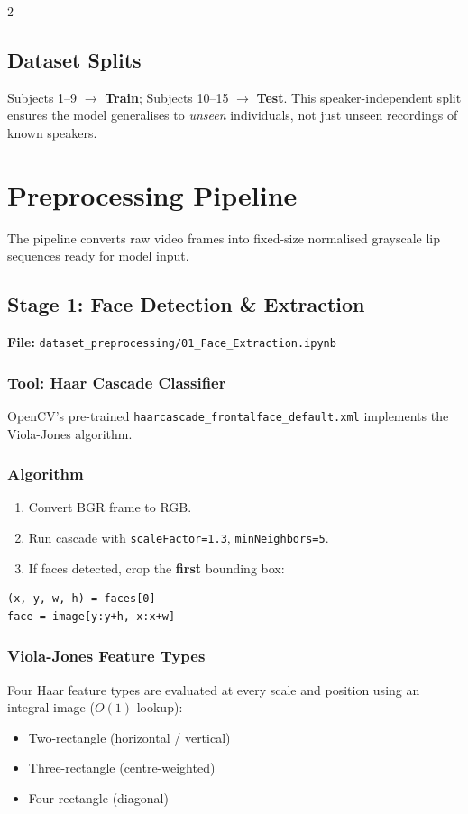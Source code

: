 \documentclass[10pt, a4paper]{article}
\begin{document}
\begin{multicols}{2}
\subsection{Dataset Splits}
Subjects 1--9 $\to$ \textbf{Train};
Subjects 10--15 $\to$ \textbf{Test}.
This speaker-independent split ensures the model generalises to
\textit{unseen} individuals, not just unseen recordings of known speakers.

\section{Preprocessing Pipeline}

The pipeline converts raw video frames into fixed-size normalised
grayscale lip sequences ready for model input.

\subsection{Stage 1: Face Detection \& Extraction}
\textbf{File:} \texttt{dataset\_preprocessing/01\_Face\_Extraction.ipynb}

\subsubsection{Tool: Haar Cascade Classifier}
OpenCV's pre-trained \texttt{haarcascade\_frontalface\_default.xml}
implements the Viola-Jones algorithm.

\subsubsection{Algorithm}
\begin{enumerate}
  \item Convert BGR frame to RGB.
  \item Run cascade with \texttt{scaleFactor=1.3}, \texttt{minNeighbors=5}.
  \item If faces detected, crop the \textbf{first} bounding box:
\end{enumerate}
\begin{codebox}
\footnotesize
\begin{verbatim}
(x, y, w, h) = faces[0]
face = image[y:y+h, x:x+w]
\end{verbatim}
\end{codebox}

\subsubsection{Viola-Jones Feature Types}
Four Haar feature types are evaluated at every scale and position
using an integral image ($O(1)$ lookup):
\begin{itemize}
  \item Two-rectangle (horizontal / vertical)
  \item Three-rectangle (centre-weighted)
  \item Four-rectangle (diagonal)
\end{itemize}
\columnbreak

\end{multicols}
\end{document}
